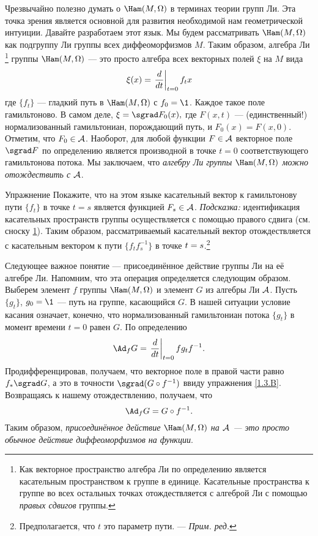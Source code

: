 {\sloppy 

Чрезвычайно полезно думать о $\Ham (M, \Omega)$ в терминах теории групп Ли.
Эта точка зрения является основной для развития необходимой нам геометрической интуиции.
Давайте разработаем этот язык.
Мы будем рассматривать $\Ham (M, \Omega)$ как подгруппу Ли группы всех диффеоморфизмов $M$.
Таким образом, алгебра Ли%
\footnote{\label{footnote} Как векторное пространство алгебра Ли по определению является касательным пространством к группе в единице.
Касательные пространства к группе во всех остальных точках отождествляется с алгеброй Ли с помощью {}\emph{правых сдвигов} группы.}
группы $\Ham (M, \Omega)$ — это просто алгебра всех векторных полей $\xi$ на $M$ вида 
\[\xi(x)=\left.\frac{d}{d t}\right|_{t=0}f_tx\]
где $\{f_t\}$ — гладкий путь в $\Ham (M, \Omega)$ с $f_0 = \1$.
Каждое такое поле гамильтоново.
В самом деле, $\xi = \sgrad F_0 (x),$ где $F (x, t)$ — (единственный!) нормализованный гамильтониан, порождающий путь, и $F_0 (x) = F (x, 0)$.
Отметим, что $F_0 \in \mathcal{A}$.
Наоборот, для любой функции $F \in \mathcal{A}$ векторное поле $\sgrad F$ по определению является производной в точке $t = 0$ соответствующего гамильтонова потока.
Мы заключаем, что \emph{алгебру Ли группы $\Ham (M, \Omega)$ можно отождествить с $\mathcal{A}$}.

\begin{ex}{Упражнение}\label{1.4.G}
Покажите, что на этом языке касательный вектор к гамильтонову пути $\{f_t\}$ в точке $t = s$ является функцией $F_s \in \mathcal{A}$.
\emph{Подсказка:} идентификация касательных пространств группы осуществляется с помощью правого сдвига (см. сноску \ref{footnote}).
Таким образом, рассматриваемый касательный вектор отождествляется с
касательным вектором к пути $\{f_tf_s^{-1}\}$ в точке $t \z= s$.\footnote{Предполагается, что $t$ это параметр пути. — \textit{Прим. ред.}}
\end{ex}

Следующее важное понятие — присоединённое действие группы Ли на её алгебре Ли.
Напомним, что эта операция определяется следующим образом.
Выберем элемент $f$ группы $\Ham (M, \Omega)$ и элемент $G$ из алгебры Ли $\mathcal{A}$.
Пусть $\{g_t\}$, $g_0 = \1$ — путь на группе, касающийся $G$.
В нашей ситуации условие касания означает, конечно, что нормализованный гамильтониан потока $\{g_t\}$ в момент времени $t = 0$ равен $G$.
По определению 
\[\Ad_f G = \left.\frac{\d}{\d t}\right|_{t=0} fg_tf^{-1}.\]
Продифференцировав, получаем, что векторное поле в правой части равно $f_\ast \sgrad G$, а это в точности $\sgrad  (G\circ f^{-1})$ ввиду упражнения \ref{1.3.B}.
Возвращаясь к нашему отождествлению, получаем, что 
\[\Ad_f G = G \circ f^{-1}.\]
Таким образом, \emph{присоединённое действие $\Ham (M, \Omega)$ на $\mathcal{A}$ — это просто обычное действие диффеоморфизмов на функции}.

}
